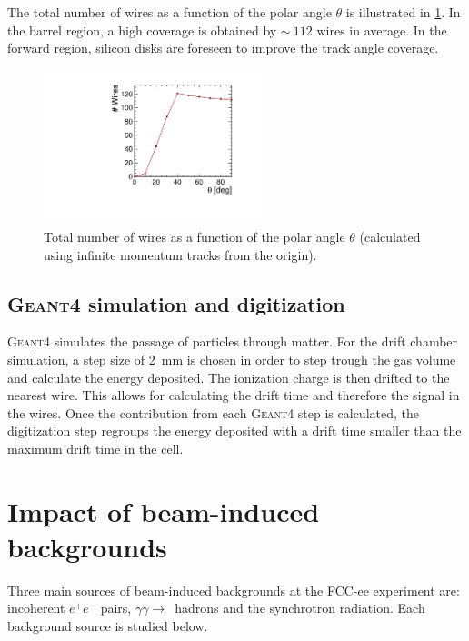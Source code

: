 \documentclass[conference]{IEEEtran}
\begin{document}
The total number of wires as a function of the polar angle $\theta$ is illustrated in \cref{fig_segmentation_second_case}. In the barrel region, a high coverage is obtained by $\sim~112$ wires in average. In the forward region, silicon disks are foreseen to improve the track angle coverage.

\begin{figure}[!t]
	\centering
	\includegraphics[width=2.5in]{Poster/Figures/numWires}%
	\caption{Total number of wires as a function of the polar angle $\theta$ (calculated using infinite momentum tracks from the origin).}
	\label{fig_segmentation_second_case}
\end{figure}


\subsection{\textsc{Geant4} simulation and digitization}
\textsc{Geant4} simulates the passage of particles through matter. For the drift chamber simulation, a step size of 2~mm is chosen in order to step trough the gas volume and calculate the energy deposited. The ionization charge is then drifted to the nearest wire. This allows for calculating the drift time and therefore the signal in the wires. Once the contribution from each \textsc{Geant4} step is calculated, the digitization step regroups the energy deposited with a drift time smaller than the maximum drift time in the cell.

\section{Impact of beam-induced backgrounds}
Three main sources of beam-induced backgrounds at the FCC-ee experiment are: incoherent $e^+e^-$ pairs, $\gamma\gamma\rightarrow$~hadrons and the synchrotron radiation. Each background source is studied below.
\end{document}
